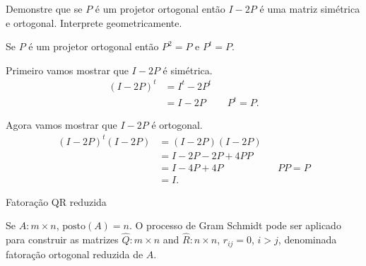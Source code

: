 \begin{questions}

    \question Demonstre que se $P$ \'{e} um projetor ortogonal ent\~{a}o $I - 2 P$ \'{e} uma matriz sim\'{e}trica e ortogonal. Interprete geometricamente.
    \begin{solution}
        Se $P$ \'{e} um projetor ortogonal ent\~{a}o $P^2 = P$ e $P^t = P$.

        Primeiro vamos mostrar que $I - 2 P$ \'{e} sim\'{e}trica.
        \begin{align*}
            \left( I - 2 P \right)^t &= I^t - 2 P^t \\
            &= I - 2 P && P^t = P.
        \end{align*}

        Agora vamos mostrar que $I - 2 P$ \'{e} ortogonal.
        \begin{align*}
            \left( I - 2 P \right)^t \left( I - 2 P \right) &= \left( I - 2 P \right) \left( I - 2 P \right) \\
            &= I - 2 P - 2 P + 4 P P \\
            &= I - 4 P + 4 P && P P = P \\
            &= I.
        \end{align*}
    \end{solution}
    
    \question Fatora\c{c}\~{a}o QR reduzida

    Se $A : m \times n$, $\text{posto}(A) = n$. O processo de Gram Schmidt pode ser aplicado para construir as matrizes $\hat{Q} : m \times n$ and $\hat{R} : n \times n$, $r_{ij} = 0$, $i > j$, denominada fatora\c{c}\~{a}o ortogonal reduzida de $A$. 
    

\end{questions}
